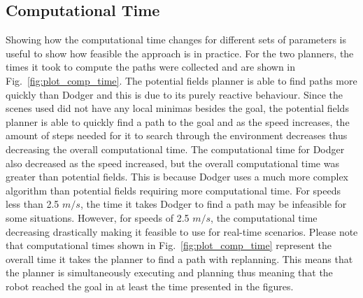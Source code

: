 \documentclass[letterpaper, 10pt, conference]{ieeeconf}
\begin{document}
\subsection{Computational Time}

Showing how the computational time changes for different sets of parameters is
useful to show how feasible the approach is in practice. For the two planners,
the times it took to compute the paths were collected and are shown in
Fig.~\ref{fig:plot_comp_time}. The potential fields planner is able to find
paths more quickly than Dodger and this is due to its purely reactive
behaviour.  Since the scenes used did not have any local minimas besides the
goal, the potential fields planner is able to quickly find a path to the goal
and as the speed increases, the amount of steps needed for it to search through
the environment decreases thus decreasing the overall computational time.  The
computational time for Dodger also decreased as the speed increased, but the
overall computational time was greater than potential fields. This is because
Dodger uses a much more complex algorithm than potential fields requiring more
computational time. For speeds less than 2.5 $m/s$, the time it takes Dodger to
find a path may be infeasible for some situations.  However, for speeds of 2.5
$m/s$, the computational time decreasing drastically making it feasible to use
for real-time scenarios.  Please note that computational times shown in
Fig.~\ref{fig:plot_comp_time} represent the overall time it takes the planner
to find a path with replanning.  This means that the planner is simultaneously
executing and planning thus meaning that the robot reached the goal in at least
the time presented in the figures.
\end{document}
